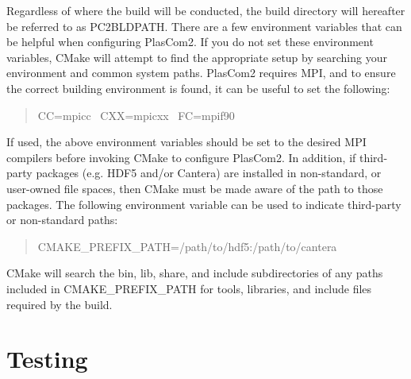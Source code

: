 Regardless of where the build will be conducted, the build directory will hereafter be referred to as P\+C2\+B\+L\+D\+P\+A\+TH. There are a few environment variables that can be helpful when configuring Plas\+Com2. If you do not set these environment variables, C\+Make will attempt to find the appropriate setup by searching your environment and common system paths. Plas\+Com2 requires M\+PI, and to ensure the correct building environment is found, it can be useful to set the following\+:~\newline
 \begin{quote}
CC=mpicc~\newline
C\+XX=mpicxx~\newline
FC=mpif90~\newline
\end{quote}


If used, the above environment variables should be set to the desired M\+PI compilers before invoking C\+Make to configure Plas\+Com2. In addition, if third-\/party packages (e.\+g. H\+D\+F5 and/or Cantera) are installed in non-\/standard, or user-\/owned file spaces, then C\+Make must be made aware of the path to those packages. The following environment variable can be used to indicate third-\/party or non-\/standard paths\+:~\newline
 \begin{quote}
C\+M\+A\+K\+E\+\_\+\+P\+R\+E\+F\+I\+X\+\_\+\+P\+A\+TH=/path/to/hdf5\+:/path/to/cantera~\newline
\end{quote}


C\+Make will search the bin, lib, share, and include subdirectories of any paths included in C\+M\+A\+K\+E\+\_\+\+P\+R\+E\+F\+I\+X\+\_\+\+P\+A\+TH for tools, libraries, and include files required by the build.\hypertarget{getting_started_test}{}\section{Testing}\label{getting_started_test}
